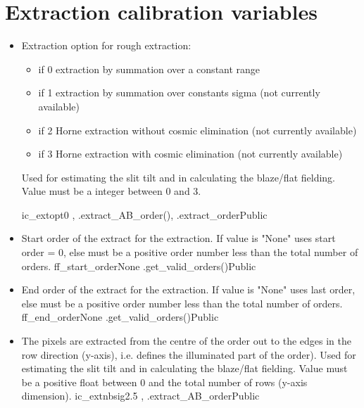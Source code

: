 \clearpage
\newpage
\section{Extraction calibration variables}
\label{ch:variables:extraction}

\begin{itemize}

\item {}
{Extraction option for rough extraction:
\begin{itemize}
\item if 0 extraction by summation over a constant range
\item if 1 extraction by summation over constants sigma (not currently available)
\item if 2 Horne extraction without cosmic elimination (not currently available)
\item if 3 Horne extraction with cosmic elimination (not currently available)
\end{itemize}
 Used for estimating the slit tilt and in calculating the blaze/flat fielding. Value must be a integer between 0 and 3.
}
{ic\_extopt}{0}
{\calSLIT, \calFFraw}{\constantsfile}
{\spirouEXTOR.extract\_AB\_order(), \spirouEXTOR.extract\_order}{Public}


\item {}
{Start order of the extract for the extraction. If value is "None" uses start order = 0, else must be a positive order number less than the total number of orders.}
{ff\_start\_order}{None}
{\calextractRAW}{\constantsfile}{\spirouEXTOR.get\_valid\_orders()}{Public}


\item {}
{End order of the extract for the extraction. If value is "None" uses last order, else must be a positive order number less than the total number of orders.}
{ff\_end\_order}{None}
{\calextractRAW}{\constantsfile}{\spirouEXTOR.get\_valid\_orders()}{Public}


\item {}
{The pixels are extracted from the centre of the order out to the edges in the row direction (y-axis), i.e. defines the illuminated part of the order). Used for estimating the slit tilt and in calculating the blaze/flat fielding. Value must be a positive float between 0 and the total number of rows (y-axis dimension).}
{ic\_extnbsig}{2.5}
{\calSLIT, \calFFraw}{\constantsfile}{\spirouEXTOR.extract\_AB\_order}{Public}



\end{itemize}
